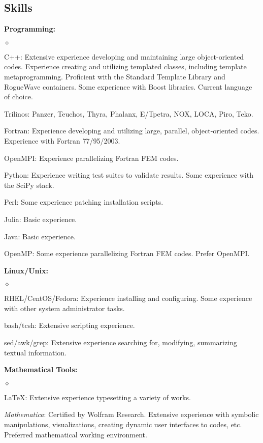 \documentclass[margin,line,pifont,palatino,10pt]{res}
\begin{document}
\begin{resume}
\vspace{1.5mm}
\section{\sc Skills}

{\bf Programming:}
\begin{list}{$\diamond$}{\leftmargin=0.15in}
	\item C++:  Extensive experience developing and maintaining large object-oriented codes.  Experience creating and utilizing templated classes, including template metaprogramming.  Proficient with the Standard Template Library and RogueWave containers.  Some experience with Boost libraries.  Current language of choice.
  \item Trilinos:  Panzer, Teuchos, Thyra, Phalanx, E/Tpetra, NOX, LOCA, Piro, Teko.
	\item Fortran:  Experience developing and utilizing large, parallel, object-oriented codes.  Experience with Fortran 77/95/2003.
	\item OpenMPI:  Experience parallelizing Fortran FEM codes.
	\item Python:  Experience writing test suites to validate results.  Some experience with the SciPy stack.
	\item Perl:  Some experience patching installation scripts.
  \item Julia:  Basic experience.
	\item Java:  Basic experience.
	\item OpenMP:  Some experience parallelizing Fortran FEM codes.  Prefer OpenMPI.
\end{list}
{\bf Linux/Unix:}
\begin{list}{$\diamond$}{\leftmargin=0.15in}
	\item RHEL/CentOS/Fedora:  Experience installing and configuring.  Some experience with other system administrator tasks.
	\item bash/tcsh:  Extensive scripting experience.
	\item sed/awk/grep:  Extensive experience searching for, modifying, summarizing textual information.
\end{list}
{\bf Mathematical Tools:}
\begin{list}{$\diamond$}{\leftmargin=0.15in}
	\item \LaTeX:  Extensive experience typesetting a variety of works.
	\item \emph{Mathematica}:  Certified by Wolfram Research.  Extensive experience with symbolic manipulations, visualizations, creating dynamic user interfaces to codes, etc.  Preferred mathematical working environment.

\end{list}
\end{resume}
\end{document}
